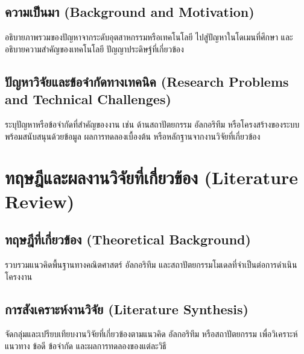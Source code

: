 \documentclass[20pt,a4paper]{article}
\begin{document}
\subsection{ความเป็นมา
(Background and Motivation)}

อธิบายภาพรวมของปัญหาจากระดับอุตสาหกรรมหรือเทคโนโลยี
ไปสู่ปัญหาในโดเมนที่ศึกษา และอธิบายความสำคัญของเทคโนโลยี
ปัญญาประดิษฐ์ที่เกี่ยวข้อง

\noindent\dotfill

\noindent\dotfill

\noindent\dotfill

\subsection{ปัญหาวิจัยและข้อจำกัดทางเทคนิค
(Research Problems and Technical Challenges)}

ระบุปัญหาหรือข้อจำกัดที่สำคัญของงาน เช่น ด้านสถาปัตยกรรม
อัลกอริทึม หรือโครงสร้างของระบบ พร้อมสนับสนุนด้วยข้อมูล
ผลการทดลองเบื้องต้น หรือหลักฐานจากงานวิจัยที่เกี่ยวข้อง

\noindent\dotfill

\noindent\dotfill

\noindent\dotfill


\section{ทฤษฎีและผลงานวิจัยที่เกี่ยวข้อง (Literature Review)}

\subsection{ทฤษฎีที่เกี่ยวข้อง (Theoretical Background)}

รวบรวมแนวคิดพื้นฐานทางคณิตศาสตร์ อัลกอริทึม
และสถาปัตยกรรมโมเดลที่จำเป็นต่อการดำเนินโครงงาน

\noindent\dotfill

\noindent\dotfill

\noindent\dotfill

\subsection{การสังเคราะห์งานวิจัย (Literature Synthesis)}

จัดกลุ่มและเปรียบเทียบงานวิจัยที่เกี่ยวข้องตามแนวคิด
อัลกอริทึม หรือสถาปัตยกรรม เพื่อวิเคราะห์แนวทาง
ข้อดี ข้อจำกัด และผลการทดลองของแต่ละวิธี
\end{document}
